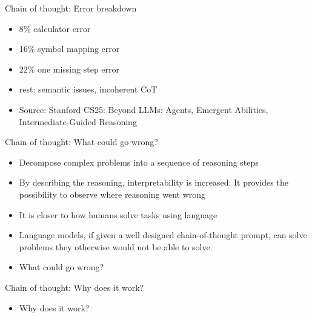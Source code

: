 

\begin{frame}{Chain of thought: Error breakdown}

\vfill

\begin{itemize}
    \item 8\% calculator error
    \item 16\% symbol mapping error
    \item 22\% one missing step error
    \item rest: semantic issues, incoherent CoT
\item Source: Stanford CS25: Beyond LLMs: Agents, Emergent
    Abilities, Intermediate-Guided Reasoning
\end{itemize}

\vfill

\end{frame}


\begin{frame}{Chain of thought: What could go wrong?}

\vfill

\begin{itemize}
    \item Decompose complex problems into a sequence of reasoning steps
    \item By describing the reasoning, interpretability is increased. It provides the possibility to observe where reasoning went wrong
    \item It is closer to how humans solve tasks using language
    \item Language models, if
given a well designed  chain-of-thought prompt, can
    solve problems they otherwise would not be able to solve.

\item \ques What could go wrong?
\end{itemize}

\vfill

\end{frame}

\begin{frame}{Chain of thought: Why does it work?}

\vfill

\begin{itemize}
    \item \ques Why does it work?
\end{itemize}

\vfill

\end{frame}



